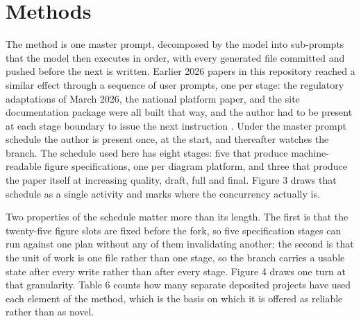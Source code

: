 \section{Methods}
\label{sec:methods}

The method is one master prompt, decomposed by the model into sub-prompts that
the model then executes in order, with every generated file committed and pushed
before the next is written. Earlier 2026 papers in this repository reached a
similar effect through a sequence of user prompts, one per stage: the
regulatory adaptations of March 2026, the national platform paper, and the site
documentation package were all built that way, and the author had to be present
at each stage boundary to issue the next instruction \cite{natplatform2026}.
Under the master prompt schedule the author is present once, at the start, and
thereafter watches the branch. The schedule used here has eight stages: five
that produce machine-readable figure specifications, one per diagram platform,
and three that produce the paper itself at increasing quality, draft, full and
final. Figure 3 draws that schedule as a single activity and marks where the
concurrency actually is.

Two properties of the schedule matter more than its length. The first is that
the twenty-five figure slots are fixed before the fork, so five specification
stages can run against one plan without any of them invalidating another; the
second is that the unit of work is one file rather than one stage, so the branch
carries a usable state after every write rather than after every stage. Figure 4
draws one turn at that granularity. Table 6 counts how many separate deposited
projects have used each element of the method, which is the basis on which it is
offered as reliable rather than as novel.

